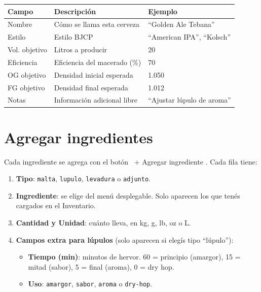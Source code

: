 \documentclass[11pt,a4paper]{report}
\newcommand{\appbtnsec}[1]{%
  \colorbox{black!10}{\footnotesize\sffamily\ #1}%
}
\begin{document}
\begin{center}
\begin{tabular}{>{\ttfamily}lll}
\toprule
\rmfamily\bfseries Campo & \rmfamily\bfseries Descripción & \rmfamily\bfseries Ejemplo \\
\midrule
Nombre        & Cómo se llama esta cerveza        & ``Golden Ale Tebana'' \\
Estilo        & Estilo BJCP                       & ``American IPA'', ``Kolsch'' \\
Vol. objetivo & Litros a producir                 & 20  \\
Eficiencia    & Eficiencia del macerado (\%)      & 70 \\
OG objetivo   & Densidad inicial esperada         & 1.050 \\
FG objetivo   & Densidad final esperada           & 1.012 \\
Notas         & Información adicional libre       & ``Ajustar lúpulo de aroma'' \\
\bottomrule
\end{tabular}
\end{center}

\section{Agregar ingredientes}

Cada ingrediente se agrega con el botón \appbtnsec{+ Agregar ingrediente}. Cada fila tiene:

\begin{enumerate}[leftmargin=*]
  \item \textbf{Tipo}: \texttt{malta}, \texttt{lupulo}, \texttt{levadura} o \texttt{adjunto}.
  \item \textbf{Ingrediente}: se elige del menú desplegable. Solo aparecen los que tenés cargados en el Inventario.
  \item \textbf{Cantidad y Unidad}: cuánto lleva, en kg, g, lb, oz o L.
  \item \textbf{Campos extra para lúpulos} (solo aparecen si elegís tipo ``lúpulo''):
  \begin{itemize}
    \item \textbf{Tiempo (min)}: minutos de hervor. 60 = principio (amargor), 15 = mitad (sabor), 5 = final (aroma), 0 = dry hop.
    \item \textbf{Uso}: \texttt{amargor}, \texttt{sabor}, \texttt{aroma} o \texttt{dry-hop}.
  \end{itemize}
\end{enumerate}
\end{document}
